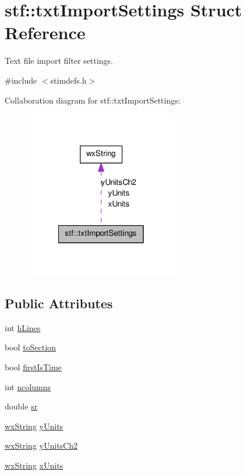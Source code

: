 \hypertarget{structstf_1_1txtImportSettings}{
\section{stf::txtImportSettings Struct Reference}
\label{structstf_1_1txtImportSettings}
}


Text file import filter settings.  




{\ttfamily \#include $<$stimdefs.h$>$}



Collaboration diagram for stf::txtImportSettings:
\nopagebreak
\begin{figure}[H]
\begin{center}
\leavevmode
\includegraphics[width=188pt]{structstf_1_1txtImportSettings__coll__graph}
\end{center}
\end{figure}
\subsection*{Public Attributes}
\begin{DoxyCompactItemize}
\item 
int \hyperlink{structstf_1_1txtImportSettings_a7356008be84b96781c8dd98dac0c3dea}{hLines}
\item 
bool \hyperlink{structstf_1_1txtImportSettings_a5f475ef7099fe1cc9fb806b666a63459}{toSection}
\item 
bool \hyperlink{structstf_1_1txtImportSettings_af7123ba3b1732914e1f3009fc0ccb888}{firstIsTime}
\item 
int \hyperlink{structstf_1_1txtImportSettings_a7240de5e36d202c93f61ef4480dc3ae1}{ncolumns}
\item 
double \hyperlink{structstf_1_1txtImportSettings_a33e95b58e6cb81cd96c84ae89445f9be}{sr}
\item 
\hyperlink{classwxString}{wxString} \hyperlink{structstf_1_1txtImportSettings_a34394c27542cef2553d2c5b774fe31cd}{yUnits}
\item 
\hyperlink{classwxString}{wxString} \hyperlink{structstf_1_1txtImportSettings_abbc806479b71e4a566b0f997fe9ca006}{yUnitsCh2}
\item 
\hyperlink{classwxString}{wxString} \hyperlink{structstf_1_1txtImportSettings_aba0b71808e781ffff32bb560aa9a1d2a}{xUnits}
\end{DoxyCompactItemize}


